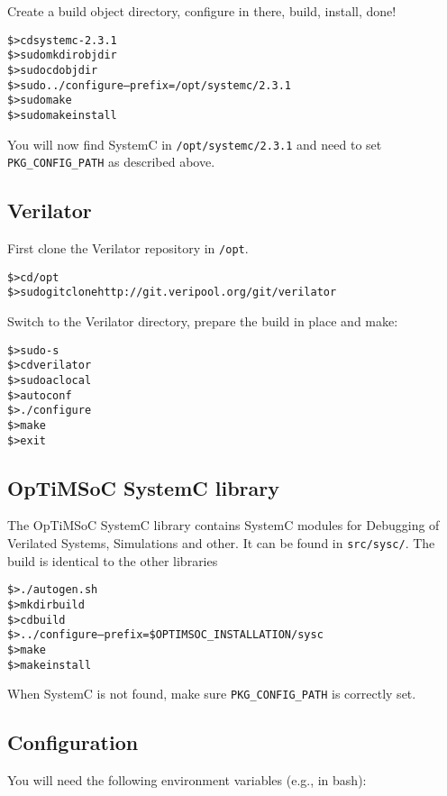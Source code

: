 Create a build object directory, configure in there, build, install,
done!

\begin{alltt}
\$> cd systemc-2.3.1
\$> sudo mkdir objdir
\$> sudo cd objdir
\$> sudo ../configure --prefix=/opt/systemc/2.3.1
\$> sudo make
\$> sudo make install
\end{alltt}

You will now find SystemC in \verb|/opt/systemc/2.3.1| and need to set
\verb|PKG_CONFIG_PATH| as described above.

\subsection{Verilator}

First clone the Verilator repository in \verb|/opt|.

\begin{alltt}
\$> cd /opt
\$> sudo git clone http://git.veripool.org/git/verilator
\end{alltt}

Switch to the Verilator directory, prepare the build in place and make:

\begin{alltt}
\$> sudo -s
\$> cd verilator
\$> sudo aclocal
\$> autoconf
\$> ./configure
\$> make
\$> exit
\end{alltt}

\subsection{OpTiMSoC SystemC library}

The OpTiMSoC SystemC library contains SystemC modules for Debugging of
Verilated Systems, Simulations and other. It can be found in
\verb|src/sysc/|. The build is identical to the other libraries

\begin{alltt}
\$> ./autogen.sh
\$> mkdir build
\$> cd build
\$> ../configure --prefix=\$OPTIMSOC_INSTALLATION/sysc
\$> make
\$> make install
\end{alltt}

When SystemC is not found, make sure \verb|PKG_CONFIG_PATH| is
correctly set.

\subsection{Configuration}

You will need the following environment variables (e.g., in bash):

